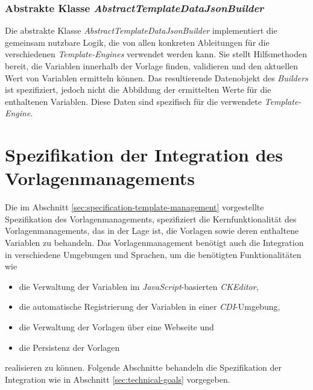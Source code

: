 \subsubsection{Abstrakte Klasse \emph{AbstractTemplateDataJsonBuilder}}
\label{sec:abstractTemplateDataJsonBuilder}
Die abstrakte Klasse \emph{AbstractTemplateDataJsonBuilder} implementiert die gemeinsam nutzbare Logik, die von allen konkreten Ableitungen für die verschiedenen \emph{Template-Engines} verwendet werden kann. Sie stellt Hilfsmethoden bereit, die Variablen innerhalb der Vorlage finden, validieren und den aktuellen Wert von Variablen ermitteln können. Das resultierende Datenobjekt des \emph{Builders} ist spezifiziert, jedoch nicht die Abbildung der ermittelten Werte für die enthaltenen Variablen. Diese Daten sind spezifisch für die verwendete \emph{Template-Engine}.

\section{Spezifikation der Integration des Vorlagenmanagements}
Die im Abschnitt \ref{sec:specification-template-management} vorgestellte Spezifikation des Vorlagenmanagements, spezifiziert die Kernfunktionalität des Vorlagenmanagements, das in der Lage ist, die Vorlagen sowie deren enthaltene Variablen zu behandeln. Das Vorlagenmanagement benötigt auch die Integration in verschiedene Umgebungen und Sprachen, um die benötigten Funktionalitäten wie
\begin{itemize}
	\item die Verwaltung der Variablen im  \emph{JavaScript}-basierten \emph{CKEditor},
	\item die automatische Registrierung der Variablen in einer \emph{CDI}-Umgebung,
	\item die Verwaltung der Vorlagen über eine Webseite und
	\item die Persistenz der Vorlagen
\end{itemize}
realisieren zu können.
\newline
\newline
Folgende Abschnitte behandeln die Spezifikation der Integration wie in Abschnitt \ref{sec:technical-goals} vorgegeben. 
 
